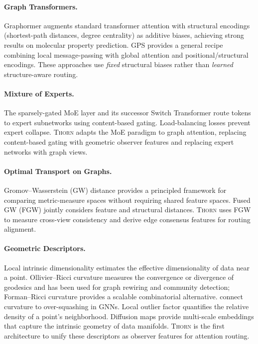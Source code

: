 \documentclass[11pt,a4paper]{article}
\newcommand{\thorn}{\textsc{Thorn}}
\begin{document}
\paragraph{Graph Transformers.}
Graphormer \citep{ying2021transformers} augments standard transformer
attention with structural encodings (shortest-path distances, degree
centrality) as additive biases, achieving strong results on molecular
property prediction.
GPS \citep{rampasek2022recipe} provides a general recipe combining local
message-passing with global attention and positional/structural
encodings.
These approaches use \emph{fixed} structural biases rather than
\emph{learned} structure-aware routing.

\paragraph{Mixture of Experts.}
The sparsely-gated MoE layer \citep{shazeer2017outrageously} and its
successor Switch Transformer \citep{fedus2022switch} route tokens to
expert subnetworks using content-based gating.
Load-balancing losses prevent expert collapse.
\thorn{} adapts the MoE paradigm to graph attention, replacing
content-based gating with geometric observer features and replacing
expert networks with graph views.

\paragraph{Optimal Transport on Graphs.}
Gromov--Wasserstein (GW) distance \citep{peyre2019computational}
provides a principled framework for comparing metric-measure spaces
without requiring shared feature spaces.
Fused GW (FGW) \citep{vayer2019optimal} jointly considers feature and
structural distances.
\thorn{} uses FGW to measure cross-view consistency and derive edge
consensus features for routing alignment.

\paragraph{Geometric Descriptors.}
Local intrinsic dimensionality \citep{levina2004maximum} estimates the
effective dimensionality of data near a point.
Ollivier--Ricci curvature \citep{ollivier2009ricci} measures the
convergence or divergence of geodesics and has been used for graph
rewiring and community detection;
Forman--Ricci curvature \citep{forman2003bochner} provides a scalable
combinatorial alternative.
\citet{topping2022understanding} connect curvature to over-squashing
in GNNs.
Local outlier factor \citep{breunig2000lof} quantifies the relative
density of a point's neighborhood.
Diffusion maps \citep{coifman2006diffusion} provide multi-scale
embeddings that capture the intrinsic geometry of data manifolds.
\thorn{} is the first architecture to unify these descriptors as
observer features for attention routing.
\end{document}
